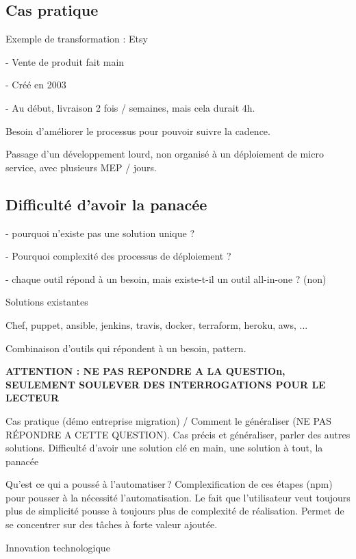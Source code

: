 \subsection{Cas pratique}


Exemple de transformation : Etsy

- Vente de produit fait main

- Créé en 2003

- Au début, livraison 2 fois / semaines, mais cela durait 4h.

Besoin d'améliorer le processus pour pouvoir suivre la cadence.

Passage d'un développement lourd, non organisé à un déploiement de micro service, avec plusieurs MEP / jours.

\subsection{Difficulté d'avoir la panacée}


- pourquoi n'existe pas une solution unique ? 

- Pourquoi complexité des processus de déploiement ? 

- chaque outil répond à un besoin, mais existe-t-il un outil all-in-one ? (non)

Solutions existantes

Chef, puppet, ansible, jenkins, travis, docker, terraform, heroku, aws, ...

Combinaison d'outils qui répondent à un besoin, pattern.


\textbf{ATTENTION : NE PAS REPONDRE A LA QUESTIOn, SEULEMENT SOULEVER DES INTERROGATIONS POUR LE LECTEUR}

Cas pratique (démo entreprise migration) / Comment le généraliser (NE PAS RÉPONDRE A CETTE QUESTION). Cas précis et généraliser, parler des autres solutions. Difficulté d'avoir une solution clé en main, une solution à tout, la panacée

Qu'est ce qui a poussé à l'automatiser ? Complexification de ces étapes (npm) pour pousser à la nécessité l'automatisation. Le fait que l'utilisateur veut toujours plus de simplicité pousse à toujours plus de complexité de réalisation. Permet de se concentrer sur des tâches à forte valeur ajoutée.

Innovation technologique 
